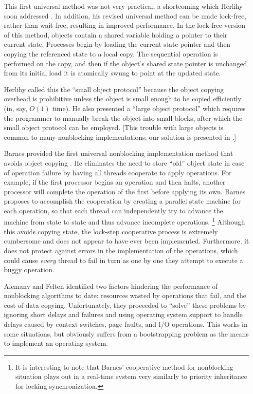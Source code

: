 This first universal method was not very practical, a shortcoming
which Herlihy soon addressed \cite{Herlihy93}.  In addition, his revised universal
method can be made lock-free, rather than wait-free, resulting in
improved performance.  In the lock-free version of this method,
objects contain a shared variable
holding a pointer to their current state.  Processes begin by loading
the current state pointer and then copying the referenced state to a
local copy.  The sequential operation is performed on the
copy, and then if the object's shared state pointer is unchanged from
its initial load it is atomically swung to point at the updated state.

Herlihy called this the ``small object protocol'' because the object
copying overhead is prohibitive unless the object is small enough to
be copied efficiently (in, say, $O(1)$ time).  He also presented a
``large object protocol'' which requires the programmer to
manually break the object into small blocks, after which the small
object protocol can be employed. 
[This trouble with large objects is
common to many nonblocking implementations; our solution is presented
in .]

Barnes provided the first universal nonblocking implementation
method that avoids object copying \cite{Barnes93}.  He eliminates the
need to store ``old'' object
state in case of operation failure by having all threads cooperate to
apply operations.  For example, if the first processor begins an operation
and then halts, another processor will complete the operation of the first
before applying its own.  Barnes proposes to accomplish the
cooperation by creating a parallel state machine for each operation,
so that each thread can independently try to advance the machine from state
to state and thus advance incomplete operations.%
\footnote{It is interesting to note that Barnes' cooperative method
  for nonblocking 
  situation plays out in a real-time system very similarly to priority
  inheritance for locking synchronization.}
Although this avoids
copying state, the lock-step cooperative process is extremely
cumbersome and does not appear to have ever been implemented.
Furthermore, it does not protect against errors in the implementation
of the operations, which could cause \emph{every} thread to fail in turn
as one by one they attempt to execute a buggy operation.

Alemany and Felten \cite{AlemanyFe92} identified two factors hindering the
performance of nonblocking algorithms to date: resources wasted by operations
that fail, and the cost of data copying.  Unfortunately, they
proceeded to
``solve'' these problems by ignoring short delays and failures and
using operating system support to handle delays caused by
context switches, page faults, and
I/O operations.  This works in some situations, but obviously suffers
from a bootstrapping problem as the means to implement an operating system.

